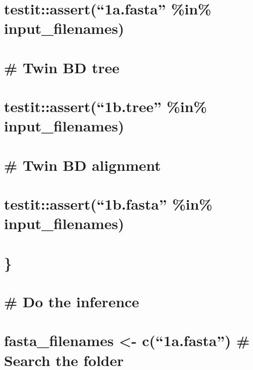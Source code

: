\documentclass[]{article}
\begin{document}
\section{\texorpdfstring{testit::assert(``1a.fasta'' \%in\%
input\_filenames)}{testit::assert(1a.fasta \%in\% input\_filenames)}}\label{testitassert1a.fasta-in-input_filenames}

\section{\# Twin BD tree}\label{twin-bd-tree}

\section{\texorpdfstring{testit::assert(``1b.tree'' \%in\%
input\_filenames)}{testit::assert(1b.tree \%in\% input\_filenames)}}\label{testitassert1b.tree-in-input_filenames}

\section{\# Twin BD alignment}\label{twin-bd-alignment}

\section{\texorpdfstring{testit::assert(``1b.fasta'' \%in\%
input\_filenames)}{testit::assert(1b.fasta \%in\% input\_filenames)}}\label{testitassert1b.fasta-in-input_filenames}

\section{\}}\label{section-1}

\section{}\label{section-2}

\section{\# Do the inference}\label{do-the-inference}

\section{\texorpdfstring{fasta\_filenames \textless{}- c(``1a.fasta'')
\# Search the
folder}{fasta\_filenames \textless{}- c(1a.fasta) \# Search the folder}}\label{fasta_filenames---c1a.fasta-search-the-folder}
\end{document}
